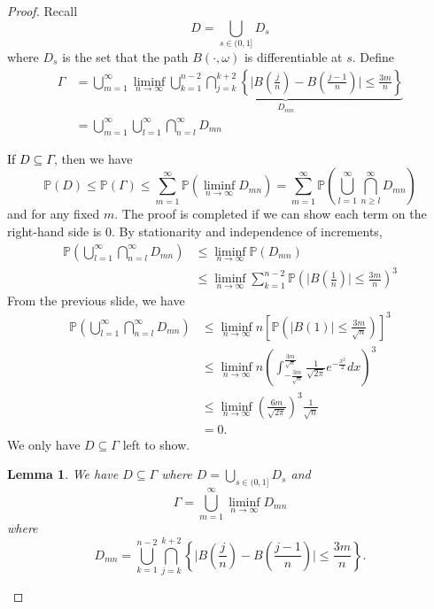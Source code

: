 \documentclass{article}
\theoremstyle{plain}
\newtheorem{lemma}{Lemma}
\theoremstyle{definition}
\begin{document}
\begin{proof}
Recall 
\[
D = \bigcup_{s\in(0,1]}D_s
\]
where $D_s$ is the set that the path $B(\cdot,\omega)$ is differentiable at $s$. Define 
\begin{align}
    \Gamma &= \bigcup_{m= 1}^\infty\liminf_{n\rightarrow \infty}\underbrace{\bigcup_{k=1}^{n-2}\bigcap_{j=k}^{k+2}\left\{\Big|B\left(\frac{j}{n}\right)-B\left(\frac{j-1}{n}\right)\Big|\le\frac{3m}{n}\right\}}_{D_{mn}}\\
    &= \bigcup_{m= 1}^\infty\bigcup_{l=1}^\infty\bigcap_{n=l}^\infty D_{mn}\nonumber
\end{align}

\textcolor{black}{If $D \subseteq \Gamma$}, then we have
\[
\mathbb{P}(D) \le \mathbb{P}(\Gamma) \le \sum_{m=1}^\infty\mathbb{P}\left(\liminf_{n\rightarrow\infty}D_{mn}\right) = \sum_{m=1}^\infty\mathbb{P}\left(\bigcup_{l=1}^\infty\bigcap_{n\ge l}^\infty D_{mn}\right)
\]
and for any fixed $m$. The proof is completed if we can show each term on the right-hand side is 0. By stationarity and independence of increments,
\begin{align*}  
\mathbb{P}\left(\bigcup_{l=1}^\infty\bigcap_{n=l}^\infty D_{mn}\right) &\le \liminf_{n\rightarrow\infty} \mathbb{P}\left(D_{mn}\right)\\
&\le \liminf_{n\rightarrow\infty} \sum_{k=1}^{n-2}\mathbb{P}\left( \Big| B\left(\frac{1}{n}\right) \Big|\le\frac{3m}{n} \right)^3
\end{align*}
From the previous slide, we have
\begin{align*}
    \mathbb{P}\left(\bigcup_{l=1}^\infty\bigcap_{n=l}^\infty D_{mn}\right) &\le \liminf_{n\rightarrow\infty} n\left[\mathbb{P}\left( \Big| B\left(1\right) \Big|\le\frac{3m}{\sqrt{n}} \right)\right]^3\\
    &\le \liminf_{n\rightarrow\infty} n\left(\int_{-\frac{3m}{\sqrt{n}}}^{\frac{3m}{\sqrt{n}}}\frac{1}{\sqrt{2\pi}}e^{-\frac{x^2}{2}}dx\right)^3\\
    &\le\liminf_{n\rightarrow\infty}\left(\frac{6m}{\sqrt{2\pi }}\right)^3\frac{1}{\sqrt{n}}\\
    &=0.
\end{align*}
We only have $D \subseteq \Gamma$ left to show.

\begin{lemma}
We have $D \subseteq \Gamma$ where $D = \bigcup_{s\in(0,1]}D_s$ and 
\[
\Gamma = \bigcup_{m= 1}^\infty\liminf_{n\rightarrow \infty} D_{mn}
\]
where 
\[
D_{mn} = \bigcup_{k=1}^{n-2}\bigcap_{j=k}^{k+2}\left\{\Big|B\left(\frac{j}{n}\right)-B\left(\frac{j-1}{n}\right)\Big|\le\frac{3m}{n}\right\}.
\]
\end{lemma}


\end{proof}
\end{document}
